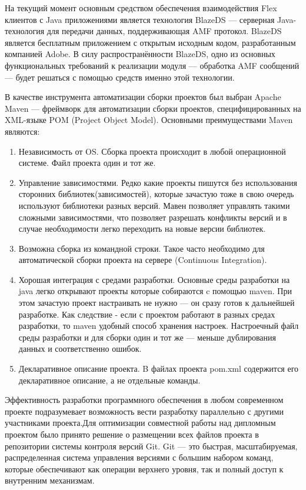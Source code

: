 На текущий момент основным средством обеспечения взаимодействия Flex клиентов с Java приложениями является технология
BlazeDS --- серверная Java-технология для передачи данных, поддерживающая AMF протокол. BlazeDS является бесплатным
приложением с открытым исходным кодом, разработанным компанией Adobe. В силу распространённости BlazeDS, одно из основных
функциональных требований к реализации модуля --- обработка AMF сообщений --- будет решаться с помощью средств именно
этой технологии.

В качестве инструмента автоматизации сборки проектов был выбран Apache Maven --- фреймворк для автоматизации сборки
проектов, специфицированных на XML-языке POM (Project Object Model). Основными преимуществами Maven являются:

\begin{enumerate}
\item Независимость от OS. Сборка проекта происходит в любой операционной системе. Файл проекта один и тот же.
\item Управление зависимостями. Редко какие проекты пишутся без использования сторонних библиотек(зависимостей), которые
 зачастую тоже в свою очередь используют библиотеки разных версий. Мавен позволяет управлять такими сложными
 зависимостями, что позволяет разрешать конфликты версий и в случае необходимости легко переходить на новые версии
 библиотек.
\item Возможна сборка из командной строки. Такое часто необходимо для автоматической сборки проекта на сервере
(Continuous Integration).
\item Хорошая интеграция с средами разработки. Основные среды разработки на java легко открывают проекты которые
собираются c помощью maven. При этом зачастую проект настраивать не нужно --- он сразу готов к дальнейшей разработке.
Как следствие - если с проектом работают в разных средах разработки, то maven удобный способ хранения настроек.
Настроечный файл среды разработки и для сборки один и тот же --- меньше дублирования данных и соответственно ошибок.
\item Декларативное описание проекта. B файлах проекта pom.xml содержится его декларативное описание, а не отдельные
команды.
\end{enumerate}

Эффективность разработки программного обеспечения в любом современном проекте подразумевает возможность вести
разработку параллельно с другими участниками проекта.Для оптимизации совместной работы над дипломным проектом было
принято решение о размещении всех файлов проекта в репозитории системы контроля версий Git. Git --- это быстрая,
масштабируемая, распределенная система управления версиями с большим набором команд, которые обеспечивают как
операции верхнего уровня, так и полный доступ к внутренним механизмам.

